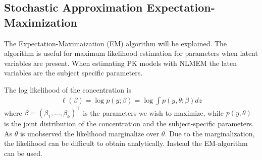 

\subsection{Stochastic Approximation Expectation-Maximization}
The Expectation-Maximaization (EM) algorithm will be explained. The algorithm is useful for maximum likelihood estimation for parameters when latent variables are present. When estimating PK models with NLMEM the laten variables are the subject specific parameters. 

The log likelihood of the concentration is
\begin{align*}
    \ell (\beta) = \log p(y;\beta) = \log \int p(y,\theta;\beta) dz
\end{align*}
where $\beta = (\beta_1, \dots, \beta_k)^{\top}$ is the parameters we wish to maximize, while $p(y,\theta)$ is the joint distribution of the concentration and the subject-specific parameters. As $\theta$ is unobserved the likelihood marginalize over $\theta$. Due to the marginalization, the likelihood can be difficult to obtain analytically. Instead the EM-algorithm can be used. 

